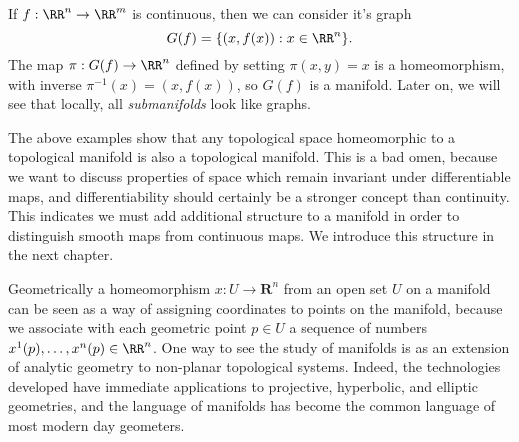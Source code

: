 \begin{example}
    If $f: \RR^n \to \RR^m$ is continuous, then we can consider it's graph
    \[ G(f) = \{ (x, f(x)) : x \in \RR^n \}. \]
    The map $\pi: G(f) \to \RR^n$ defined by setting $\pi(x,y) = x$ is a homeomorphism, with inverse $\pi^{-1}(x) = (x,f(x))$, so $G(f)$ is a manifold. Later on, we will see that locally, all \emph{submanifolds} look like graphs.
\end{example}




\begin{remark}
    The above examples show that any topological space homeomorphic to a topological manifold is also a topological manifold. This is a bad omen, because we want to discuss properties of space which remain invariant under differentiable maps, and differentiability should certainly be a stronger concept than continuity. This indicates we must add additional structure to a manifold in order to distinguish smooth maps from continuous maps. We introduce this structure in the next chapter.
\end{remark}

Geometrically a homeomorphism $x: U \to \mathbf{R}^n$ from an open set $U$ on a manifold can be seen as a way of assigning coordinates to points on the manifold, because we associate with each geometric point $p \in U$ a sequence of numbers $x^1(p), \dots, x^n(p) \in \RR^n$. One way to see the study of manifolds is as an extension of analytic geometry to non-planar topological systems. Indeed, the technologies developed have immediate applications to projective, hyperbolic, and elliptic geometries, and the language of manifolds has become the common language of most modern day geometers.


